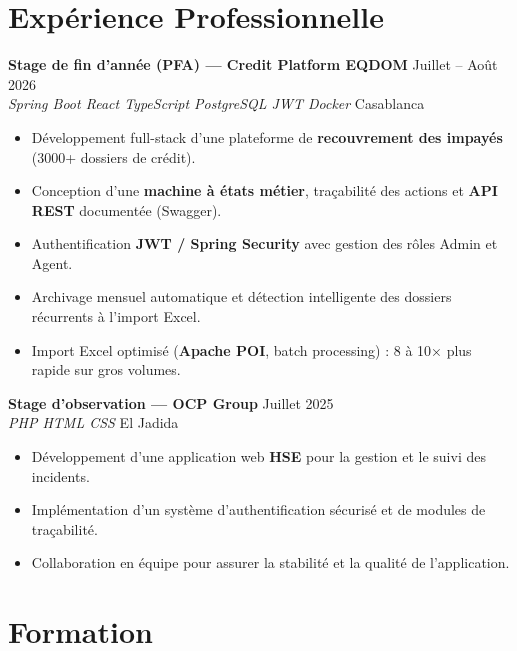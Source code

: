 \documentclass[10pt,a4paper]{article}
\begin{document}
\section*{Expérience Professionnelle}

\textbf{Stage de fin d'année (PFA) — Credit Platform EQDOM}
\hfill Juillet -- Août 2026\\
\textit{Spring Boot \textbar{} React \textbar{} TypeScript \textbar{} PostgreSQL \textbar{} JWT \textbar{} Docker}
\hfill Casablanca

\begin{itemize}
  \item Développement full-stack d'une plateforme de \textbf{recouvrement des impayés} (3000+ dossiers de crédit).
  \item Conception d'une \textbf{machine à états métier}, traçabilité des actions et \textbf{API REST} documentée (Swagger).
  \item Authentification \textbf{JWT / Spring Security} avec gestion des rôles Admin et Agent.
  \item Archivage mensuel automatique et détection intelligente des dossiers récurrents à l'import Excel.
  \item Import Excel optimisé (\textbf{Apache POI}, batch processing) : 8 à 10× plus rapide sur gros volumes.
\end{itemize}

\vspace{2pt}

\textbf{Stage d'observation — OCP Group}
\hfill Juillet 2025\\
\textit{PHP \textbar{} HTML \textbar{} CSS}
\hfill El Jadida

\begin{itemize}
  \item Développement d'une application web \textbf{HSE} pour la gestion et le suivi des incidents.
  \item Implémentation d'un système d'authentification sécurisé et de modules de traçabilité.
  \item Collaboration en équipe pour assurer la stabilité et la qualité de l'application.
\end{itemize}

\section*{Formation}
\end{document}
